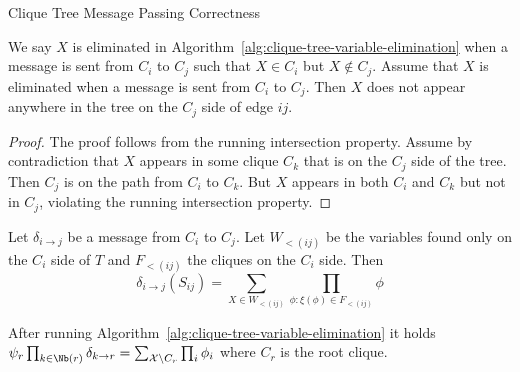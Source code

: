 \begin{frame}{Clique Tree Message Passing Correctness}
\begin{lemma}
    \label{lemma:clique-tree-elimination}
    We say $X$ is eliminated in Algorithm~\ref{alg:clique-tree-variable-elimination} when a message is sent from $C_i$ to $C_j$ such that $X \in C_i$ but $X \notin C_j$.
Assume that $X$ is eliminated when a message is sent from $C_i$ to $C_j$. Then $X$ does not appear anywhere in the tree on the $C_j$ side of edge $ij$.
\end{lemma}
\begin{proof}
    The proof follows from the running intersection property.
    \pause
    Assume by contradiction that $X$ appears in some clique $C_k$ that is on the $C_j$ side of the tree.
    \pause
    Then $C_j$ is on the path from $C_i$ to $C_k$.
    \pause
    But $X$ appears in both $C_i$ and $C_k$ but not in $C_j$, violating the running intersection property.
\end{proof}
\pause
\begin{theorem}
    \label{thm:clique-tree-sp-message-expression}
Let $\delta_{i \rightarrow j}$ be a message from $C_i$ to $C_j$. 
Let $W_{<(ij)}$ be the variables found only on the $C_i$ side of $T$ and $F_{<(ij)}$ the cliques on the $C_i$ side. Then 
\begin{equation}
    \label{eq:clique-tree-message-expression}
    \delta_{i \rightarrow j}(S_{ij}) = \sum_{X \in W_{<(ij)}} \prod_{\phi: \xi(\phi) \in F_{<(ij)}} \phi 
\end{equation}
\end{theorem}
\pause
\vspace{-0.2cm}
\begin{corollary}
    After running Algorithm~\ref{alg:clique-tree-variable-elimination} it holds
    $\psi_r \prod_{k \in \Nb(r)} \delta_{k \rightarrow r} = \sum_{\mathcal{X} \backslash C_r} \prod_{i} \phi_i$ where $C_r$ is the root clique.
\end{corollary}
\end{frame}

